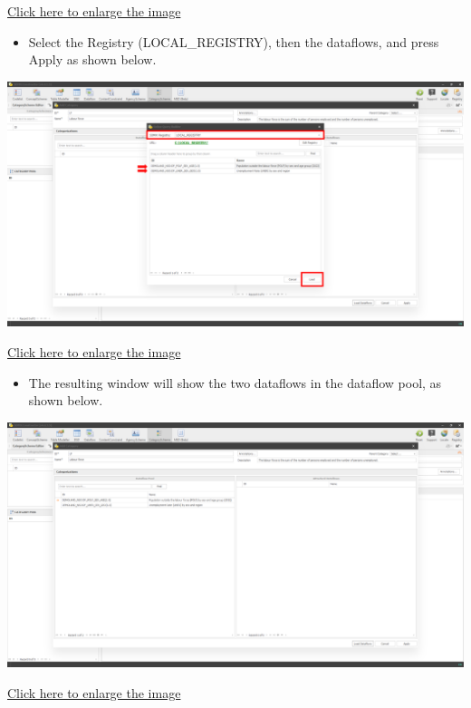 \documentclass[
]{book}
\providecommand{\tightlist}{%
  \setlength{\itemsep}{0pt}\setlength{\parskip}{0pt}}
\begin{document}
\href{images/image166.png}{Click here to enlarge the image}

\begin{itemize}
\tightlist
\item
  Select the Registry (LOCAL\_REGISTRY), then the dataflows, and press Apply as shown below.
\end{itemize}

\begin{center}\includegraphics[width=1\linewidth]{./images/image168} \end{center}

\href{images/image168.png}{Click here to enlarge the image}

\begin{itemize}
\tightlist
\item
  The resulting window will show the two dataflows in the dataflow pool, as shown below.
\end{itemize}

\begin{center}\includegraphics[width=1\linewidth]{./images/image170} \end{center}

\href{images/image170.png}{Click here to enlarge the image}
\end{document}
